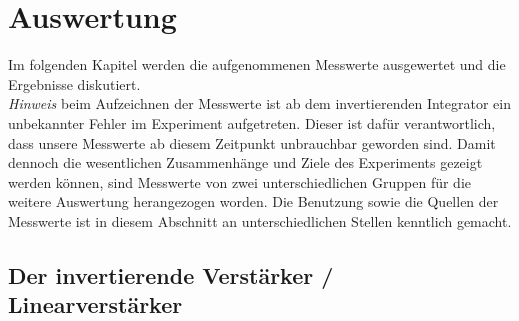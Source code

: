 \newpage
\section{Auswertung}
Im folgenden Kapitel werden die aufgenommenen Messwerte ausgewertet und die Ergebnisse 
diskutiert.\\
\textit{Hinweis} beim Aufzeichnen der Messwerte ist ab dem invertierenden Integrator
ein unbekannter Fehler im Experiment aufgetreten. Dieser ist dafür verantwortlich, dass
unsere Messwerte ab diesem Zeitpunkt unbrauchbar geworden sind.
Damit dennoch die wesentlichen Zusammenhänge und Ziele des Experiments gezeigt werden können,
sind Messwerte von zwei unterschiedlichen Gruppen für die weitere Auswertung herangezogen worden.
Die Benutzung sowie die Quellen der Messwerte
ist in diesem Abschnitt an unterschiedlichen Stellen kenntlich gemacht.

\subsection{Der invertierende Verstärker / Linearverstärker}
